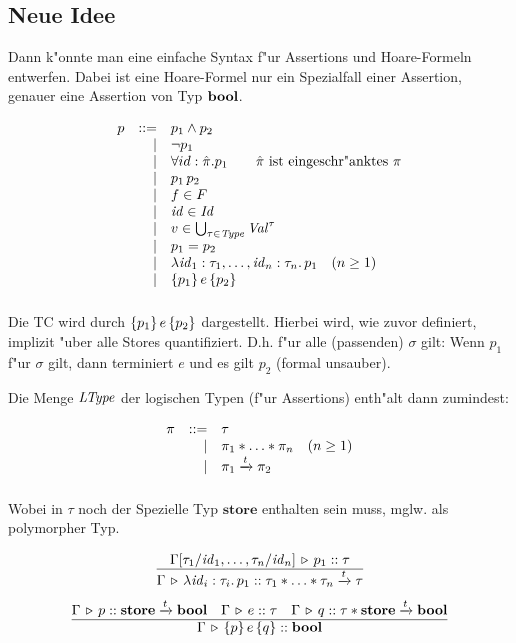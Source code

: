 \documentclass[12pt,a4paper,bigheadings]{scrartcl}
\begin{document}
\subsection*{Neue Idee}

Dann k"onnte man eine einfache Syntax f"ur Assertions und Hoare-Formeln entwerfen. Dabei ist
eine Hoare-Formel nur ein Spezialfall einer Assertion, genauer eine Assertion von Typ $\textbf{bool}$.

\[\bgram
p \is p_1 \wedge p_2
  \al \neg p_1
  \al \forall id:\hat{\pi}. p_1 \quad\quad \text{$\hat{\pi}$ ist eingeschr"anktes $\pi$}
  \al \app{p_1}{p_2}
  \al f \in F
  \al \id \in \Id
  \al v \in \bigcup_{\tau\in\Type} \Val^\tau
  \al p_1 = p_2
  \al \abstr{\id_1:\tau_1,\ldots,\id_n:\tau_n}{p_1} \quad (n \ge 1)
  \al \triple{p_1}{e}{p_2}
  \n
\egram\]

\noindent
Die TC wird durch $\{p_1\}\,e\,\{p_2\}$ dargestellt. Hierbei wird, wie zuvor definiert, implizit
"uber alle Stores quantifiziert. D.h. f"ur alle (passenden) $\sigma$ gilt: Wenn $p_1$ f"ur $\sigma$
gilt, dann terminiert $e$ und es gilt $p_2$ (formal unsauber).

Die Menge ${\text{\it LType\/}}$ der logischen Typen (f"ur Assertions) enth"alt dann zumindest:

\[\bgram
\pi \is \tau
    \al \pi_1 * \ldots * \pi_n \quad (n \ge 1)
    \al \pi_1 \xrightarrow{t} \pi_2
    \n
\egram\]

\noindent
Wobei in $\tau$ noch der Spezielle Typ $\textbf{store}$ enthalten sein muss, mglw.
als polymorpher Typ.

\[
  \regel{\Tj{\Gamma[\tau_1/\id_1,\ldots,\tau_n/\id_n]}{p_1}{\tau}}
        {\Tj{\Gamma}{\abstr{\id_i:\tau_i}{p_1}}{\tau_1*\ldots*\tau_n\xrightarrow{t}\tau}}
\]
\[
  \regel{\Tj{\Gamma}{p}{\textbf{store}\xrightarrow{t}\bool} \quad
         \Tj{\Gamma}{e}{\tau} \quad
         \Tj{\Gamma}{q}{\tau*\textbf{store}\xrightarrow{t}\bool}}
        {\Tj{\Gamma}{\triple{p}{e}{q}}{\bool}}
\]
\end{document}
